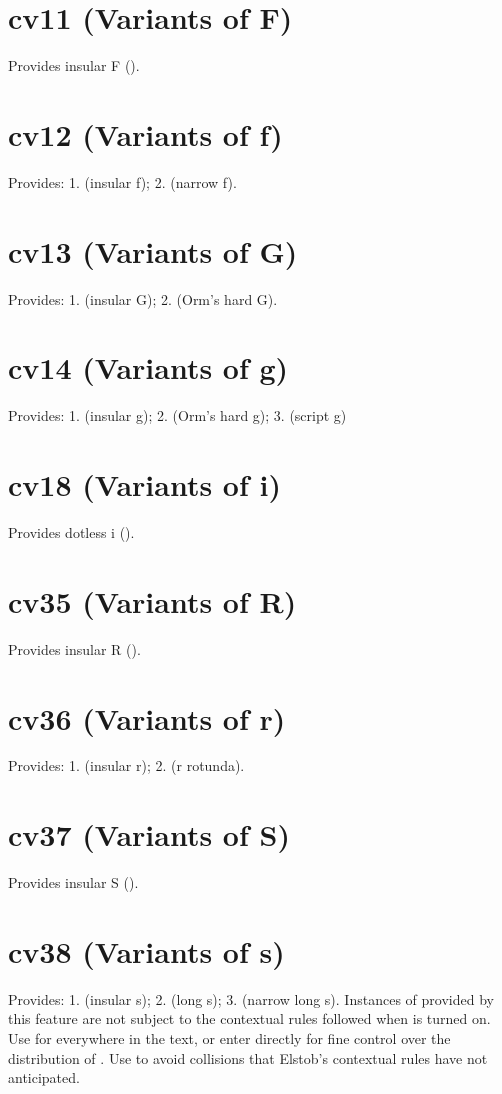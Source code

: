 \documentclass[12pt,letterpaper,openany]{book}
\begin{document}
\section{cv11 (Variants of F)}
Provides insular F ().

\section{cv12 (Variants of f)}
Provides: 1.  (insular f); 2.  (narrow f).

\section{cv13 (Variants of G)}
Provides: 1.  (insular G); 2.  (Orm’s hard G).

\section{cv14 (Variants of g)}
Provides: 1.  (insular g); 2.  (Orm’s hard g);
3.  (script g)

\section{cv18 (Variants of i)}
Provides dotless i ().

\section{cv35 (Variants of R)}
Provides insular R ().

\section{cv36 (Variants of r)}
Provides: 1.  (insular r); 2.  (r rotunda).

\section{cv37 (Variants of S)}
Provides insular S ().

\section{cv38 (Variants of s)}
Provides: 1.  (insular s); 2.  (long s);
3.  (narrow long s). Instances of \textbf{}
provided by this feature are not subject to the contextual rules followed
when  is turned on. Use  for \textbf{}
everywhere in the text, or enter  directly for fine control over the
distribution of \textbf{}. Use  to avoid collisions that
Elstob’s contextual rules have not anticipated.
\end{document}
